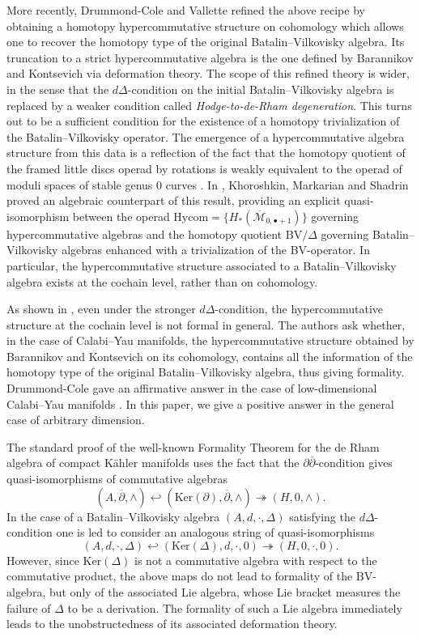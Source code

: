 \documentclass[a4paper]{amsart}
\theoremstyle{definition}
\theoremstyle{theorem}
\newcommand{\Ker}{\mathrm{Ker}}
\newcommand{\del}{\partial}
\newcommand{\delb}{{\overline\partial}}
\newcommand{\BV}{{\mathrm{BV}}}
\newcommand{\Hycom}{{\mathrm{Hycom}}}
\begin{document}
More recently, Drummond-Cole and Vallette \cite{DCV} refined the above recipe by obtaining a homotopy hypercommutative
structure on cohomology 
which allows one to recover the homotopy type of the original Batalin--Vilkovisky algebra.
Its truncation to a strict hypercommutative algebra is the one defined by Barannikov and Kontsevich via deformation theory. 
The scope of this refined theory is wider, in the sense that the  $d\Delta$-condition on the initial Batalin--Vilkovisky algebra is replaced by a weaker condition called \textit{Hodge-to-de-Rham degeneration}.
This turns out to be a sufficient condition for the existence of a
homotopy trivialization of the Batalin--Vilkovisky operator. The emergence of a hypercommutative algebra structure from this data
is a reflection of the fact that the homotopy quotient of the framed little discs operad by rotations
is weakly equivalent to the operad of moduli spaces of stable genus 0 curves \cite{DCRotations}.
In \cite{KMS}, Khoroshkin, Markarian and Shadrin proved an algebraic counterpart of this result, providing an explicit quasi-isomorphism between the operad  $\Hycom=\{H_*(\overline{\mathcal{M}}_{0,\bullet+1})\}$ governing hypercommutative algebras and the
homotopy quotient $\BV/\Delta$ governing 
Batalin--Vilkovisky algebras enhanced with a trivialization of the BV-operator. In particular, the hypercommutative structure associated to a Batalin--Vilkovisky algebra exists at the cochain level, rather than on cohomology.

As shown in \cite{DCV}, even under the stronger $d\Delta$-condition, the hypercommutative structure at the cochain level is not formal in general.
The authors ask whether, in the case of Calabi--Yau manifolds, the hypercommutative structure obtained by Barannikov and Kontsevich
on its cohomology, contains all the information of the homotopy type of the original Batalin--Vilkovisky algebra, thus giving formality.
Drummond-Cole gave an affirmative answer in the case of low-dimensional Calabi--Yau manifolds \cite{DC}.
In this paper, we give a positive answer in the general case of arbitrary dimension.
\medskip 

The standard proof of the well-known Formality Theorem for the de Rham algebra of compact Kähler manifolds \cite{DGMS}
uses the fact that the $\del\delb$-condition gives quasi-isomorphisms of commutative algebras 
\[(A,\delb,\wedge)\hookleftarrow (\Ker(\del),\delb,\wedge)\twoheadrightarrow(H,0,\wedge).\]
In the case of a Batalin--Vilkovisky algebra $(A,d,\cdot,\Delta)$ satisfying the $d\Delta$-condition one is led to consider an analogous string of quasi-isomorphisms
\[(A,d,\cdot,\Delta)\hookleftarrow (\Ker(\Delta),d,\cdot,0)\twoheadrightarrow(H,0,\cdot,0).\]
However, since $\Ker(\Delta)$ is not a commutative algebra with respect to the commutative product, the above maps do not lead to formality of the $\BV$-algebra, but only of
the associated Lie algebra, whose Lie bracket measures the failure of $\Delta$ to be a derivation. 
The formality of such a Lie algebra immediately leads to the unobstructedness of its associated deformation theory.
\end{document}
